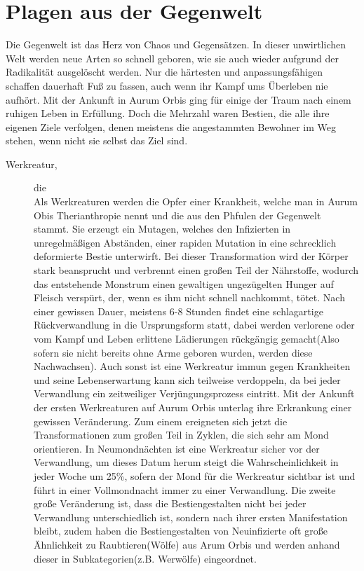 \documentclass[a4paper,12pt,oneside]{book}
\begin{document}
\chapter{Plagen aus der Gegenwelt}
Die Gegenwelt ist das Herz von Chaos und Gegensätzen. In dieser unwirtlichen Welt werden neue Arten so schnell geboren, wie sie auch wieder aufgrund der Radikalität ausgelöscht werden. Nur die härtesten und anpassungsfähigen schaffen dauerhaft Fuß zu fassen, auch wenn ihr Kampf ums Überleben nie aufhört. Mit der Ankunft in Aurum Orbis ging für einige der Traum nach einem ruhigen Leben in Erfüllung. Doch die Mehrzahl waren Bestien, die alle ihre eigenen Ziele verfolgen, denen meistens die angestammten Bewohner im Weg stehen, wenn nicht sie selbst das Ziel sind. 
\begin{description}
\item[Werkreatur,]die
\\Als Werkreaturen werden die Opfer einer Krankheit, welche man in Aurum Obis Therianthropie nennt und die aus den Phfulen der Gegenwelt stammt. Sie erzeugt ein Mutagen, welches den Infizierten in unregelmäßigen Abständen, einer rapiden Mutation in eine schrecklich deformierte Bestie unterwirft. Bei dieser Transformation wird der Körper stark beansprucht und verbrennt einen großen Teil der Nährstoffe, wodurch das entstehende Monstrum einen gewaltigen ungezügelten Hunger auf Fleisch verspürt, der, wenn es ihm nicht schnell nachkommt, tötet. Nach einer gewissen Dauer, meistens 6-8 Stunden findet eine schlagartige Rückverwandlung in die Ursprungsform statt, dabei werden verlorene oder vom Kampf und Leben erlittene Lädierungen rückgängig gemacht(Also sofern sie nicht bereits ohne Arme geboren wurden, werden diese Nachwachsen). Auch sonst ist eine Werkreatur immun gegen Krankheiten und seine Lebenserwartung kann sich teilweise verdoppeln, da bei jeder Verwandlung ein zeitweiliger Verjüngungsprozess eintritt.
Mit der Ankunft der ersten Werkreaturen auf Aurum Orbis unterlag ihre Erkrankung einer gewissen Veränderung. Zum einem ereigneten sich jetzt die Transformationen zum großen Teil in Zyklen, die sich sehr am Mond orientieren. In Neumondnächten ist eine Werkreatur sicher vor der Verwandlung, um dieses Datum herum steigt die Wahrscheinlichkeit in jeder Woche um 25\%, sofern der Mond für die Werkreatur sichtbar ist und führt in einer Vollmondnacht immer zu einer Verwandlung. Die zweite große Veränderung ist, dass die Bestiengestalten nicht bei jeder Verwandlung unterschiedlich ist, sondern nach ihrer ersten Manifestation bleibt, zudem haben die Bestiengestalten von Neuinfizierte oft große Ähnlichkeit zu Raubtieren(Wölfe) aus Arum Orbis und werden anhand dieser in Subkategorien(z.B. Werwölfe) eingeordnet.

\end{description}
\end{document}
